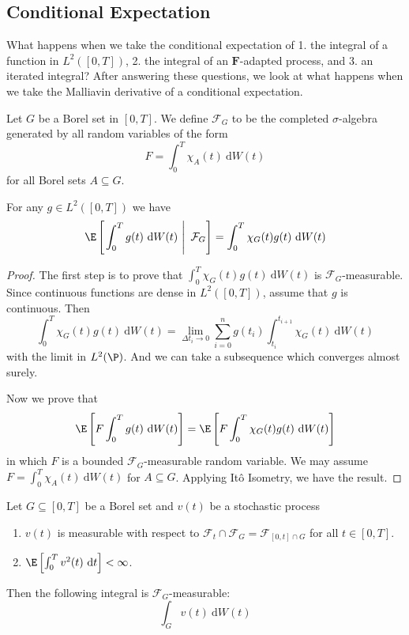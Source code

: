 \subsection{Conditional Expectation}

What happens when we take the conditional expectation of 1. the integral of a function in $L^2([0, T])$, 2. the integral of an $\mathbf{F}$-adapted process, and 3. an iterated integral? After answering these questions, we look at what happens when we take the Malliavin derivative of a conditional expectation. 

\begin{definition}
Let $G$ be a Borel set in $[0,T]$. We define $\mathcal{F}_G$ to be the completed $\sigma$-algebra generated by all random variables of the form 
$$
F = \int_0^T \chi_A(t) ~\mathrm{d}W(t)
$$
for all Borel sets $A \subseteq G$.
\end{definition}

\begin{lemma}\label{lm:202310311340} 
	For any $g \in L^2([0,T])$ we have 
	$$
	\E \left[ \left.\int_0^T g(t) ~\mathrm{d} W(t) ~\right| ~\mathcal{F}_G \right] = \int_0^ T \chi_G(t) g(t) ~\mathrm{d} W(t)
	$$
\end{lemma}

\begin{proof}
	The first step is to prove that $\int_0^T \chi_G(t) g(t) ~\mathrm{d}W(t)$ is $\mathcal{F}_G$-measurable. Since continuous functions are dense in $L^2([0,T])$, assume that $g$ is continuous. Then 
	$$
	\int_0^T \chi_G(t) g(t) ~\mathrm{d}W(t) = \lim_{\Delta t_i \to 0} \sum_{i=0}^n g(t_i) \int_{t_i}^{t_{i+1}} \chi_G(t) ~\mathrm{d}W(t)
	$$
	with the limit in $L^2(\P)$. And we can take a subsequence which converges almost surely.

	Now we prove that 
	$$
	\E \left[ F \int_0^T g(t) ~\mathrm{d}W(t) \right] = \E \left[ F \int_0^T \chi_G(t) g(t) ~\mathrm{d}W(t) \right] 
	$$
	in which $F$ is a bounded $\mathcal{F}_G$-measurable random variable. We may assume $F = \int_0^T \chi_A(t) ~\mathrm{d}W(t)$ for $A \subseteq G$. Applying Itô Isometry, we have the result.
\end{proof}

\begin{lemma}\label{lm:202310311343}
	Let $G \subseteq [0,T]$ be a Borel set and $v(t)$ be a stochastic process  
	\begin{enumerate}
	\item $v(t)$ is measurable with respect to $\mathcal{F}_t \cap \mathcal{F}_G = \mathcal{F}_{[0,t] \cap G}$ for all $t \in [0,T]$.
	\item $\E \left[ \int_0^T v^2(t) ~\mathrm{d}t \right] < \infty$.
	\end{enumerate}

	Then the following integral is $\mathcal{F}_G$-measurable:
	$$
	\int_G v(t) ~\mathrm{d}W(t)
	$$
\end{lemma}

